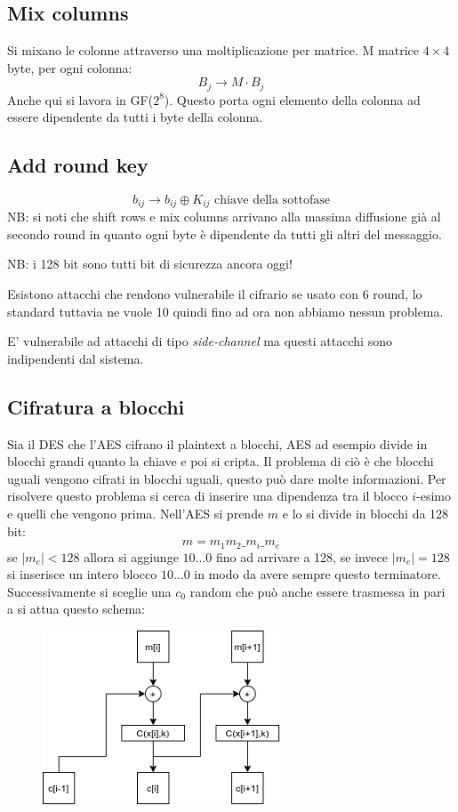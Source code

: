\subsection{Mix columns}
Si mixano le colonne attraverso una moltiplicazione per matrice.
M matrice $4 \times 4$ byte, per ogni colonna:
$$
    B_{j} \xrightarrow{} M \cdot B_{j}
$$
Anche qui si lavora in GF($2^8$). Questo porta ogni elemento della colonna ad essere dipendente da tutti i byte della colonna.

\subsection{Add round key}
$$
    b_{ij} \xrightarrow{} b_{ij} \oplus K_{ij} \text{ chiave della sottofase}
$$
NB: si noti che shift rows e mix columns arrivano alla massima diffusione già al secondo round in quanto ogni byte è dipendente da tutti gli altri del messaggio.

NB: i 128 bit sono tutti bit di sicurezza ancora oggi!

Esistono attacchi che rendono vulnerabile il cifrario se usato con 6 round, lo standard tuttavia ne vuole 10 quindi fino ad ora non abbiamo nessun problema.

E' vulnerabile ad attacchi di tipo \emph{side-channel} ma questi attacchi sono indipendenti dal sistema.

\subsection{Cifratura a blocchi}
Sia il DES che l'AES cifrano il plaintext a blocchi, AES ad esempio divide in blocchi grandi quanto la chiave e poi si cripta.
Il problema di ciò è che blocchi uguali vengono cifrati in blocchi uguali, questo può dare molte informazioni.
Per risolvere questo problema si cerca di inserire una dipendenza tra il blocco $i$-esimo e quelli che vengono prima.
Nell'AES si prende $m$ e lo si divide in blocchi da 128 bit:
$$ m = m_{1}m_{2}\_m_{i}\_m_{e} $$
se $\mid m_e \mid < 128$ allora si aggiunge $10...0$ fino ad arrivare a 128, se invece $\mid m_e \mid = 128$ si inserisce un intero blocco $10...0$ in modo da avere sempre questo terminatore.
Successivamente si sceglie una $c_0$ random che può anche essere trasmessa in pari a si attua questo schema:
\begin{figure}[H]
    \centering
    \includegraphics[width = 200pt]{CBC.png}
\end{figure}

